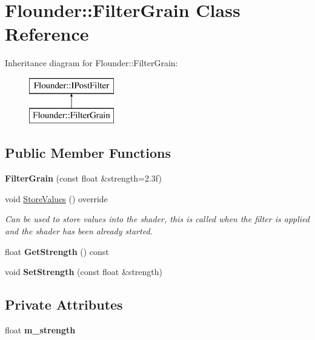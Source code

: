 \hypertarget{class_flounder_1_1_filter_grain}{}\section{Flounder\+:\+:Filter\+Grain Class Reference}
\label{class_flounder_1_1_filter_grain}
Inheritance diagram for Flounder\+:\+:Filter\+Grain\+:\begin{figure}[H]
\begin{center}
\leavevmode
\includegraphics[height=2.000000cm]{class_flounder_1_1_filter_grain}
\end{center}
\end{figure}
\subsection*{Public Member Functions}
\begin{DoxyCompactItemize}
\item 
\mbox{\label{class_flounder_1_1_filter_grain_aca3c4bb57a211843091bd24df63f2170}} 
{\bfseries Filter\+Grain} (const float \&strength=2.\+3f)
\item 
void \hyperlink{class_flounder_1_1_filter_grain_a5cf7471f57b7a64c47bfe8a8b8f6dd01}{Store\+Values} () override
\begin{DoxyCompactList}\small\item\em Can be used to store values into the shader, this is called when the filter is applied and the shader has been already started. \end{DoxyCompactList}\item 
\mbox{\label{class_flounder_1_1_filter_grain_a2097ef43d1360a04198ac67385398248}} 
float {\bfseries Get\+Strength} () const
\item 
\mbox{\label{class_flounder_1_1_filter_grain_aa50f30e7897361eb991a0938ad31940c}} 
void {\bfseries Set\+Strength} (const float \&strength)
\end{DoxyCompactItemize}
\subsection*{Private Attributes}
\begin{DoxyCompactItemize}
\item 
\mbox{\label{class_flounder_1_1_filter_grain_ad6d7e71b06061b096db94b689b74d4b6}} 
float {\bfseries m\+\_\+strength}
\end{DoxyCompactItemize}
